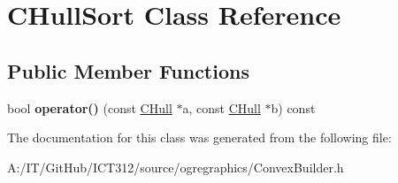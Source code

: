 \hypertarget{class_c_hull_sort}{\section{C\-Hull\-Sort Class Reference}
\label{class_c_hull_sort}
}
\subsection*{Public Member Functions}
\begin{DoxyCompactItemize}
\item 
\hypertarget{class_c_hull_sort_aa5de23224fa2388336df7b6bccc94d59}{bool {\bfseries operator()} (const \hyperlink{class_c_hull}{C\-Hull} $\ast$a, const \hyperlink{class_c_hull}{C\-Hull} $\ast$b) const }\label{class_c_hull_sort_aa5de23224fa2388336df7b6bccc94d59}

\end{DoxyCompactItemize}


The documentation for this class was generated from the following file\-:\begin{DoxyCompactItemize}
\item 
A\-:/\-I\-T/\-Git\-Hub/\-I\-C\-T312/source/ogregraphics/Convex\-Builder.\-h\end{DoxyCompactItemize}
